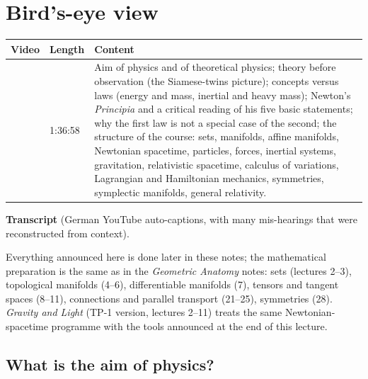 \chapter{Bird's-eye view}\label{ch:c01}
\begin{paracol}{2}

\begin{sources}
\begin{tabularx}{\linewidth}{@{}l l L@{}}
\toprule
\textbf{Video} & \textbf{Length} & \textbf{Content}\\
\midrule
{} & 1:36:58 & Aim of physics and of theoretical physics; theory
before observation (the Siamese-twins picture); concepts versus laws (energy and mass, inertial and heavy mass);
Newton's \emph{Principia} and a critical reading of his five basic statements; why the first law is not a special
case of the second; the structure of the course: sets, manifolds, affine manifolds, Newtonian spacetime,
particles, forces, inertial systems, gravitation, relativistic spacetime, calculus of variations, Lagrangian and
Hamiltonian mechanics, symmetries, symplectic manifolds, general relativity.\\
\bottomrule
\end{tabularx}

\smallskip
\textbf{Transcript}  (German YouTube auto-captions, with many
mis-hearings that were reconstructed from context).
\end{sources}

\begin{reading}
Everything announced here is done later in these notes; the mathematical preparation is the same as in the
\emph{Geometric Anatomy} notes: sets (lectures 2--3), topological manifolds (4--6), differentiable manifolds (7),
tensors and tangent spaces (8--11), connections and parallel transport (21--25), symmetries (28).
\emph{Gravity and Light} (TP-1 version, lectures 2--11) treats the same Newtonian-spacetime programme with the
tools announced at the end of this lecture.
\end{reading}

\section{What is the aim of physics?}\label{sec:bv-aim}


\end{paracol}

